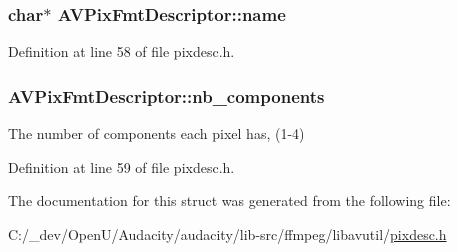 \subsubsection[{\texorpdfstring{name}{name}}]{ char$\ast$ A\+V\+Pix\+Fmt\+Descriptor\+::name}\hypertarget{struct_a_v_pix_fmt_descriptor_a10736c3f1288eb87b23ede3ffdefb435}{}\label{struct_a_v_pix_fmt_descriptor_a10736c3f1288eb87b23ede3ffdefb435}


Definition at line 58 of file pixdesc.\+h.

\subsubsection[{\texorpdfstring{nb\+\_\+components}{nb_components}}]{ A\+V\+Pix\+Fmt\+Descriptor\+::nb\+\_\+components}\hypertarget{struct_a_v_pix_fmt_descriptor_ae83de203f97288c9f4070212a5eac5de}{}\label{struct_a_v_pix_fmt_descriptor_ae83de203f97288c9f4070212a5eac5de}


The number of components each pixel has, (1-\/4) 



Definition at line 59 of file pixdesc.\+h.



The documentation for this struct was generated from the following file\+:\begin{DoxyCompactItemize}
\item 
C\+:/\+\_\+dev/\+Open\+U/\+Audacity/audacity/lib-\/src/ffmpeg/libavutil/\hyperlink{pixdesc_8h}{pixdesc.\+h}\end{DoxyCompactItemize}
